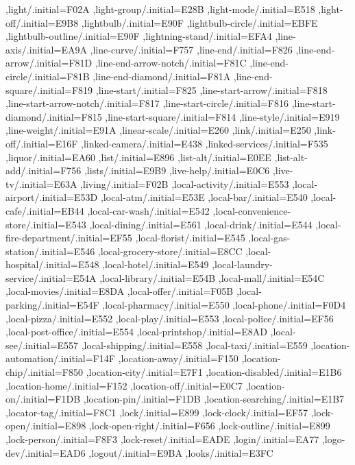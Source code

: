 { ,light/.initial=F02A
 ,light-group/.initial=E28B
 ,light-mode/.initial=E518
 ,light-off/.initial=E9B8
 ,lightbulb/.initial=E90F
 ,lightbulb-circle/.initial=EBFE
 ,lightbulb-outline/.initial=E90F
 ,lightning-stand/.initial=EFA4
 ,line-axis/.initial=EA9A
 ,line-curve/.initial=F757
 ,line-end/.initial=F826
 ,line-end-arrow/.initial=F81D
 ,line-end-arrow-notch/.initial=F81C
 ,line-end-circle/.initial=F81B
 ,line-end-diamond/.initial=F81A
 ,line-end-square/.initial=F819
 ,line-start/.initial=F825
 ,line-start-arrow/.initial=F818
 ,line-start-arrow-notch/.initial=F817
 ,line-start-circle/.initial=F816
 ,line-start-diamond/.initial=F815
 ,line-start-square/.initial=F814
 ,line-style/.initial=E919
 ,line-weight/.initial=E91A
 ,linear-scale/.initial=E260
 ,link/.initial=E250
 ,link-off/.initial=E16F
 ,linked-camera/.initial=E438
 ,linked-services/.initial=F535
 ,liquor/.initial=EA60
 ,list/.initial=E896
 ,list-alt/.initial=E0EE
 ,list-alt-add/.initial=F756
 ,lists/.initial=E9B9
 ,live-help/.initial=E0C6
 ,live-tv/.initial=E63A
 ,living/.initial=F02B
 ,local-activity/.initial=E553
 ,local-airport/.initial=E53D
 ,local-atm/.initial=E53E
 ,local-bar/.initial=E540
 ,local-cafe/.initial=EB44
 ,local-car-wash/.initial=E542
 ,local-convenience-store/.initial=E543
 ,local-dining/.initial=E561
 ,local-drink/.initial=E544
 ,local-fire-department/.initial=EF55
 ,local-florist/.initial=E545
 ,local-gas-station/.initial=E546
 ,local-grocery-store/.initial=E8CC
 ,local-hospital/.initial=E548
 ,local-hotel/.initial=E549
 ,local-laundry-service/.initial=E54A
 ,local-library/.initial=E54B
 ,local-mall/.initial=E54C
 ,local-movies/.initial=E8DA
 ,local-offer/.initial=F05B
 ,local-parking/.initial=E54F
 ,local-pharmacy/.initial=E550
 ,local-phone/.initial=F0D4
 ,local-pizza/.initial=E552
 ,local-play/.initial=E553
 ,local-police/.initial=EF56
 ,local-post-office/.initial=E554
 ,local-printshop/.initial=E8AD
 ,local-see/.initial=E557
 ,local-shipping/.initial=E558
 ,local-taxi/.initial=E559
 ,location-automation/.initial=F14F
 ,location-away/.initial=F150
 ,location-chip/.initial=F850
 ,location-city/.initial=E7F1
 ,location-disabled/.initial=E1B6
 ,location-home/.initial=F152
 ,location-off/.initial=E0C7
 ,location-on/.initial=F1DB
 ,location-pin/.initial=F1DB
 ,location-searching/.initial=E1B7
 ,locator-tag/.initial=F8C1
 ,lock/.initial=E899
 ,lock-clock/.initial=EF57
 ,lock-open/.initial=E898
 ,lock-open-right/.initial=F656
 ,lock-outline/.initial=E899
 ,lock-person/.initial=F8F3
 ,lock-reset/.initial=EADE
 ,login/.initial=EA77
 ,logo-dev/.initial=EAD6
 ,logout/.initial=E9BA
 ,looks/.initial=E3FC
}

